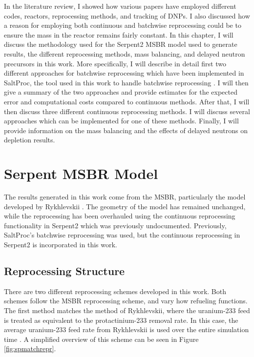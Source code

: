 \renewcommand*\descriptionlabel[1]{\hspace\leftmargin$#1$}
\setcounter{tocdepth}{5}
\setcounter{secnumdepth}{5}




In the literature review, I showed how various papers have employed different codes, reactors, reprocessing methods, and tracking of DNPs. I also discussed how a reason for employing both continuous and batchwise reprocessing could be to ensure the mass in the reactor remains fairly constant. In this chapter, I will discuss the methodology used for the Serpent2 MSBR model used to generate results, the different reprocessing methods, mass balancing, and delayed neutron precursors in this work.
More specifically, I will describe in detail first two different approaches for batchwise reprocessing which have been implemented in SaltProc, the tool used in this work to handle batchwise reprocessing \cite{rykhlevskii_saltproc_2018}. I will then give a summary of the two approaches and provide estimates for the expected error and computational costs compared to continuous methods.
After that, I will then discuss three different continuous reprocessing methods.
I will discuss several approaches which can be implemented for one of these methods.
Finally, I will provide information on the mass balancing and the effects of delayed neutrons on depletion results.


\section{Serpent MSBR Model}

The results generated in this work come from the MSBR, particularly the model developed by Rykhlevskii \cite{rykhlevskii_advanced_2018}. The geometry of the model has remained unchanged, while the reprocessing has been overhauled using the continuous reprocessing functionality in Serpent2 which was previously undocumented. Previously, SaltProc's batchwise reprocessing was used, but the continuous reprocessing in Serpent2 is incorporated in this work.

\subsection{Reprocessing Structure}
\label{s:decay-tank}

There are two different reprocessing schemes developed in this work. Both schemes follow the MSBR reprocessing scheme, and vary how refueling functions. The first method matches the method of Rykhlevskii, where the uranium-233 feed is treated as equivalent to the protactinium-233 removal rate. In this case, the average uranium-233 feed rate from Rykhlevskii is used over the entire simulation time \cite{rykhlevskii_advanced_2018}. A simplified overview of this scheme can be seen in Figure \ref{fig:spmatchrepr}.


